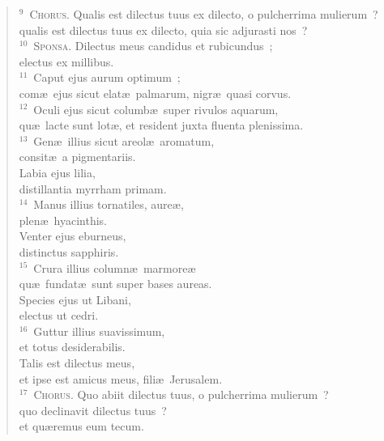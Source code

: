 \begin{verse}
${}^{9}$~\textsc{Chorus.} Qualis est dilectus tuus ex dilecto, o pulcherrima mulierum~?\\ qualis est dilectus tuus ex dilecto, quia sic adjurasti nos~?\\
${}^{10}$~\textsc{Sponsa.} Dilectus meus candidus et rubicundus~;\\ electus ex millibus.\\
${}^{11}$~Caput ejus aurum optimum~;\\ com\ae\ ejus sicut elat\ae\ palmarum, nigr\ae\ quasi corvus.\\
${}^{12}$~Oculi ejus sicut columb\ae\ super rivulos aquarum,\\ qu\ae\ lacte sunt lot\ae , et resident juxta fluenta plenissima.\\
${}^{13}$~Gen\ae\ illius sicut areol\ae\ aromatum,\\ consit\ae\ a pigmentariis.\\ Labia ejus lilia,\\ distillantia myrrham primam.\\
${}^{14}$~Manus illius tornatiles, aure\ae ,\\ plen\ae\ hyacinthis.\\ Venter ejus eburneus,\\ distinctus sapphiris.\\
${}^{15}$~Crura illius column\ae\ marmore\ae \\ qu\ae\ fundat\ae\ sunt super bases aureas.\\ Species ejus ut Libani,\\ electus ut cedri.\\
${}^{16}$~Guttur illius suavissimum,\\ et totus desiderabilis.\\ Talis est dilectus meus,\\ et ipse est amicus meus, fili\ae\ Jerusalem.\\
${}^{17}$~\textsc{Chorus.} Quo abiit dilectus tuus, o pulcherrima mulierum~?\\ quo declinavit dilectus tuus~?\\ et qu\ae remus eum tecum.\end{verse}


